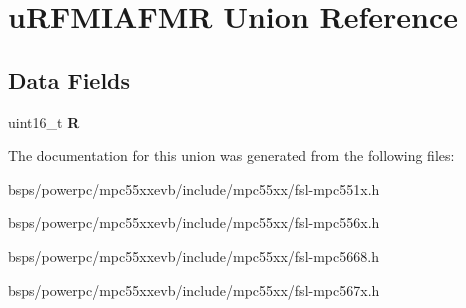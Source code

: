 \hypertarget{unionuRFMIAFMR}{}\section{u\+R\+F\+M\+I\+A\+F\+MR Union Reference}
\label{unionuRFMIAFMR}
\subsection*{Data Fields}
\begin{DoxyCompactItemize}
\item 
\mbox{\label{unionuRFMIAFMR_ad08bd6904fac38bc4171d764e5ecfd4e}} 
uint16\+\_\+t {\bfseries R}
\end{DoxyCompactItemize}


The documentation for this union was generated from the following files\+:\begin{DoxyCompactItemize}
\item 
bsps/powerpc/mpc55xxevb/include/mpc55xx/fsl-\/mpc551x.\+h\item 
bsps/powerpc/mpc55xxevb/include/mpc55xx/fsl-\/mpc556x.\+h\item 
bsps/powerpc/mpc55xxevb/include/mpc55xx/fsl-\/mpc5668.\+h\item 
bsps/powerpc/mpc55xxevb/include/mpc55xx/fsl-\/mpc567x.\+h\end{DoxyCompactItemize}
